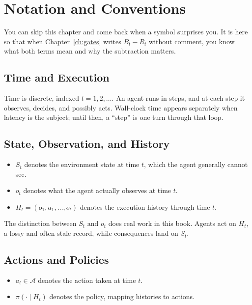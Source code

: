 \chapter*{Notation and Conventions}

You can skip this chapter and come back when a symbol surprises you. It is here
so that when Chapter~\ref{ch:gates} writes $B_t - R_t$ without comment, you know
what both terms mean and why the subtraction matters.

\section*{Time and Execution}

Time is discrete, indexed $t = 1, 2, \ldots$. An agent runs in steps, and at
each step it observes, decides, and possibly acts. Wall-clock time appears
separately when latency is the subject; until then, a ``step'' is one turn
through that loop.

\section*{State, Observation, and History}

\begin{itemize}
\item $S_t$ denotes the environment state at time $t$, which the agent generally cannot see.
\item $o_t$ denotes what the agent actually observes at time $t$.
\item $H_t = (o_1, a_1, \ldots, o_t)$ denotes the execution history through time $t$.
\end{itemize}

The distinction between $S_t$ and $o_t$ does real work in this book. Agents act
on $H_t$, a lossy and often stale record, while consequences land on $S_t$.

\section*{Actions and Policies}

\begin{itemize}
\item $a_t \in \mathcal{A}$ denotes the action taken at time $t$.
\item $\pi(\cdot \mid H_t)$ denotes the policy, mapping histories to actions.
\end{itemize}

